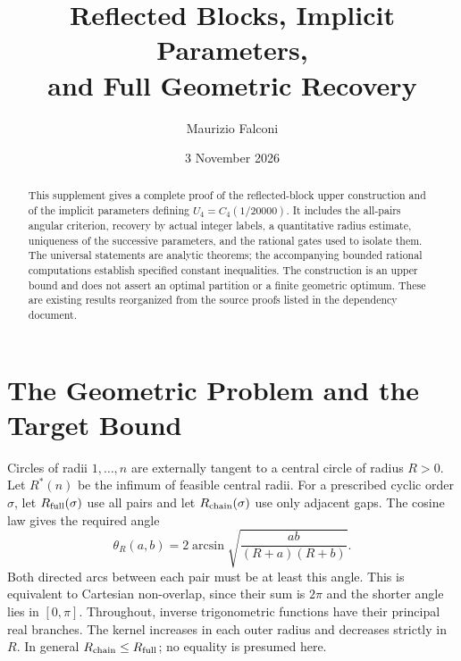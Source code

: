 \documentclass[11pt,letterpaper]{article}
\title{Reflected Blocks, Implicit Parameters,\\and Full Geometric Recovery}
\author{Maurizio Falconi}
\date{3 November 2026}
\newcommand{\Rstar}{R^*}
\newcommand{\thR}{\theta_R}
\begin{document}
\maketitle
\linenumbers
\begin{abstract}
This supplement gives a complete proof of the reflected-block upper
construction and of the implicit parameters defining
$U_4=C_4(1/20000)$. It includes the all-pairs angular criterion, recovery
by actual integer labels, a quantitative radius estimate, uniqueness of
the successive parameters, and the rational gates used to isolate them.
The universal statements are analytic theorems; the accompanying bounded
rational computations establish specified constant inequalities. The
construction is an upper bound and does not assert an optimal partition
or a finite geometric optimum. These are existing results reorganized
from the source proofs listed in the dependency document.
\end{abstract}
\tableofcontents

\section{The Geometric Problem and the Target Bound}
Circles of radii $1,\ldots,n$ are externally tangent to a central circle
of radius $R>0$. Let $\Rstar(n)$ be the infimum of feasible central radii.
For a prescribed cyclic order $\sigma$, let $R_{\rm full}(\sigma)$ use
all pairs and let $R_{\rm chain}(\sigma)$ use only adjacent gaps. The
cosine law gives the required angle
\begin{equation}\label{eq:angle}
 \thR(a,b)=2\arcsin\sqrt{\frac{ab}{(R+a)(R+b)}}.
\end{equation}
Both directed arcs between each pair must be at least this angle. This is
equivalent to Cartesian non-overlap, since their sum is $2\pi$ and the
shorter angle lies in $[0,\pi]$. Throughout, inverse trigonometric
functions have their principal real branches. The kernel increases in
each outer radius and decreases strictly in $R$. In general
$R_{\rm chain}\le R_{\rm full}$; no equality is presumed here.
\end{document}
